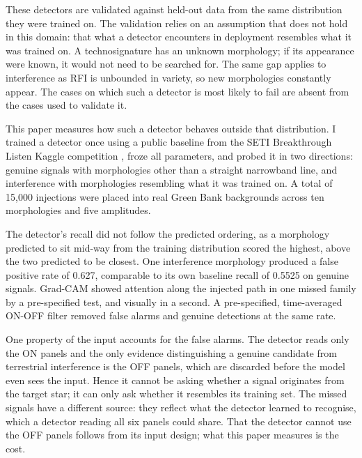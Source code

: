 \documentclass[11pt]{article}
\begin{document}
These detectors are validated against held-out data from the same distribution they were trained on. The validation relies on an assumption that does not hold in this domain: that what a detector encounters in deployment resembles what it was trained on. A technosignature has an unknown morphology; if its appearance were known, it would not need to be searched for. The same gap applies to interference as RFI is unbounded in variety, so new morphologies constantly appear. The cases on which such a detector is most likely to fail are absent from the cases used to validate it.

This paper measures how such a detector behaves outside that distribution. I trained a detector once using a public baseline from the SETI Breakthrough Listen Kaggle competition \citep{bl2021}, froze all parameters, and probed it in two directions: genuine signals with morphologies other than a straight narrowband line, and interference with morphologies resembling what it was trained on. A total of 15,000 injections were placed into real Green Bank backgrounds across ten morphologies and five amplitudes.

The detector's recall did not follow the predicted ordering, as a morphology predicted to sit mid-way from the training distribution scored the highest, above the two predicted to be closest. One interference morphology produced a false positive rate of 0.627, comparable to its own baseline recall of 0.5525 on genuine signals. Grad-CAM showed attention along the injected path in one missed family by a pre-specified test, and visually in a second. A pre-specified, time-averaged ON-OFF filter removed false alarms and genuine detections at the same rate.

One property of the input accounts for the false alarms. The detector reads only the ON panels and the only evidence distinguishing a genuine candidate from terrestrial interference is the OFF panels, which are discarded before the model even sees the input. Hence it cannot be asking whether a signal originates from the target star; it can only ask whether it resembles its training set. The missed signals have a different source: they reflect what the detector learned to recognise, which a detector reading all six panels could share. That the detector cannot use the OFF panels follows from its input design; what this paper measures is the cost.
\end{document}
